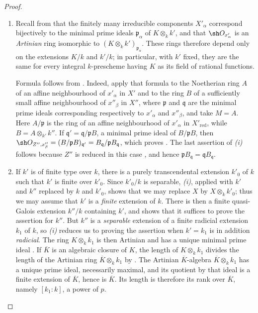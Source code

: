 \begin{proof}
\begin{enumerate}
\item[\rm(i)]
Recall from  that the finitely many irreducible
components $X'_\alpha$ correspond bijectively to the minimal prime
ideals $\mathfrak p_\alpha$ of $K\otimes_k k'$, and that
$\sh O_{x'_\alpha}$ is an \emph{Artinian} ring isomorphic to
$(K\otimes_k k')_{\mathfrak p_\alpha}$.
These rings therefore depend only on the extensions $K/k$ and $k'/k$;
in particular, with $k'$ fixed, they are the same for every integral
$k$-prescheme having $K$ as its field of rational functions.

Formula  follows from .
Indeed, apply that formula to the Noetherian ring $A$ of an affine
neighbourhood of $x'_\alpha$ in $X'$ and to the ring $B$ of a
sufficiently small affine neighbourhood of $x''_\beta$ in $X''$,
where $\mathfrak p$ and $\mathfrak q$ are the minimal prime ideals
corresponding respectively to $x'_\alpha$ and $x''_\beta$, and take
$M=A$.
Here $A/\mathfrak p$ is the ring of an affine neighbourhood of
$x'_\alpha$ in $X'_{\mathrm{red}}$, while
$B=A\otimes_{k'}k''$.
If $\mathfrak q'=\mathfrak q/\mathfrak pB$, a minimal prime ideal of
$B/\mathfrak pB$, then $\sh O_{Z'',x''_\beta}
=(B/\mathfrak pB)_{\mathfrak q'}
=B_{\mathfrak q}/\mathfrak pB_{\mathfrak q}$,
which proves .
The last assertion of \emph{(i)} follows because $Z''$ is reduced in
this case , and hence
$\mathfrak pB_{\mathfrak q}=\mathfrak qB_{\mathfrak q}$.

\item[\rm(ii)]
If $k'$ is of finite type over $k$, there is a purely transcendental
extension $k'_0$ of $k$ such that $k'$ is finite over $k'_0$.
Since $k'_0/k$ is separable, \emph{(i)}, applied with $k'$ and $k''$
replaced by $k$ and $k'_0$, shows that we may replace $X$ by
$X\otimes_k k'_0$; thus we may assume that $k'$ is a \emph{finite}
extension of $k$.
There is then a finite quasi-Galois extension $k''/k$ containing
$k'$, and  shows that it suffices to prove the
assertion for $k''$.
But $k''$ is a \emph{separable} extension of a finite radicial extension
$k_1$ of $k$, so \emph{(i)} reduces us to proving the assertion when
$k'=k_1$ is in addition \emph{radicial}.
The ring $K\otimes_k k_1$ is then Artinian and has a unique minimal
prime ideal .
If $\overline K$ is an algebraic closure of $K$, the length of
$K\otimes_k k_1$ divides the length of the Artinian ring
$\overline K\otimes_k k_1$ by .
The Artinian $\overline K$-algebra
$\overline K\otimes_k k_1$ has a unique prime ideal, necessarily
maximal, and its quotient by that ideal is a finite extension of
$\overline K$, hence is $\overline K$.
Its length is therefore its rank over $\overline K$, namely
$[k_1:k]$, a power of $p$.


\end{enumerate}
\end{proof}
